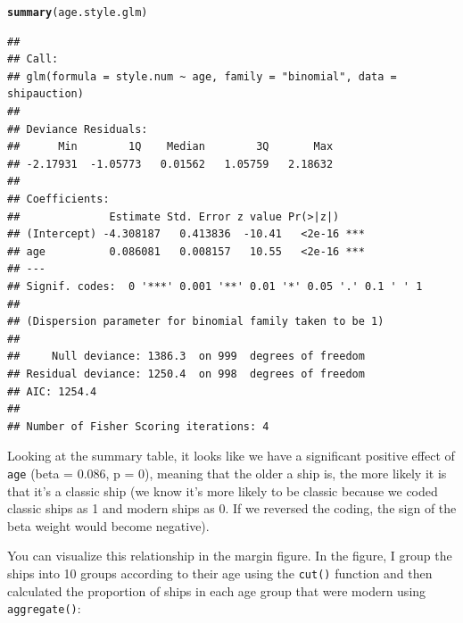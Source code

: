 \documentclass{tufte-book}\usepackage[]{graphicx}\usepackage[]{color}
\makeatletter
\newcommand{\hlstd}[1]{\textcolor[rgb]{0.345,0.345,0.345}{#1}}%
\newcommand{\hlkwd}[1]{\textcolor[rgb]{0.737,0.353,0.396}{\textbf{#1}}}%
\newenvironment{kframe}{%
 \def\at@end@of@kframe{}%
 \ifinner\ifhmode%
  \def\at@end@of@kframe{\end{minipage}}%
  \begin{minipage}{\columnwidth}%
 \fi\fi%
 \def\FrameCommand##1{\hskip\@totalleftmargin \hskip-\fboxsep
 \colorbox{shadecolor}{##1}\hskip-\fboxsep
     \hskip-\linewidth \hskip-\@totalleftmargin \hskip\columnwidth}%
 \MakeFramed {\advance\hsize-\width
   \@totalleftmargin\z@ \linewidth\hsize
   \@setminipage}}%
 {\par\unskip\endMakeFramed%
 \at@end@of@kframe}
\newenvironment{knitrout}{}{} %
\makeatother
\begin{document}
\begin{knitrout}
\color{fgcolor}\begin{kframe}
\begin{alltt}
\hlkwd{summary}\hlstd{(age.style.glm)}
\end{alltt}
\begin{verbatim}
## 
## Call:
## glm(formula = style.num ~ age, family = "binomial", data = shipauction)
## 
## Deviance Residuals: 
##      Min        1Q    Median        3Q       Max  
## -2.17931  -1.05773   0.01562   1.05759   2.18632  
## 
## Coefficients:
##              Estimate Std. Error z value Pr(>|z|)    
## (Intercept) -4.308187   0.413836  -10.41   <2e-16 ***
## age          0.086081   0.008157   10.55   <2e-16 ***
## ---
## Signif. codes:  0 '***' 0.001 '**' 0.01 '*' 0.05 '.' 0.1 ' ' 1
## 
## (Dispersion parameter for binomial family taken to be 1)
## 
##     Null deviance: 1386.3  on 999  degrees of freedom
## Residual deviance: 1250.4  on 998  degrees of freedom
## AIC: 1254.4
## 
## Number of Fisher Scoring iterations: 4
\end{verbatim}
\end{kframe}
\end{knitrout}


Looking at the summary table, it looks like we have a significant positive effect of \texttt{age} (beta = 0.086, p = 0), meaning that the older a ship is, the more likely it is that it's a classic ship (we know it's more likely to be classic because we coded classic ships as 1 and modern ships as 0. If we reversed the coding, the sign of the beta weight would become negative).

You can visualize this relationship in the margin figure. In the figure, I group the ships into 10 groups according to their age using the \texttt{cut()} function and then calculated the proportion of ships in each age group that were modern using \texttt{aggregate()}:
\end{document}
